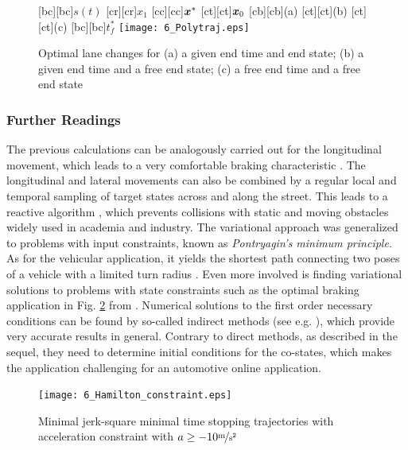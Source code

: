 \begin{figure}[h]
\centering
	[bc][bc]{$s(t)$}
	[cr][cr]{$x_1$}
	[cc][cc]{$\boldsymbol{x}^\ast$}
	[ct][ct]{$\boldsymbol{x}_0$}
	[cb][cb]{\scriptsize (a)}
	[ct][ct]{\scriptsize (b)}
	[ct][ct]{\scriptsize (c)}
	[bc][bc]{$t_f^\ast$}
	\centering
  	\texttt{[image: 6\_Polytraj.eps]}
  \caption{Optimal lane changes for (a) a given end time and end state; (b) a given end time and a free end state; (c) a free end time and a free end state}
    \label{fig:polytraj}
\end{figure}

\subsubsection{Further Readings}\label{S:57.3.1.3}

The previous calculations can be analogously carried out for the longitudinal movement, which leads to a very comfortable braking characteristic \cite{gutjahr2014automatic}. 
The longitudinal and lateral movements can also be combined by a regular local and temporal sampling of target states across and along the street. 
This leads to a reactive algorithm  \cite{wericra2010}, which prevents collisions with static and moving obstacles widely used in academia and industry.
The variational approach was generalized to problems with input constraints, known as \textit{Pontryagin's minimum principle}.
 As for the vehicular application, it yields the shortest path connecting two poses of a vehicle with a limited turn radius \cite{dubins1957cml,reeds1990optimal,boissonnat1994note}. %
Even more involved is finding variational solutions to problems with state constraints such as the optimal braking application in Fig. \ref{fig:poly_mit_unb} from \cite{werling2015habil}.
Numerical solutions to the first order necessary conditions can be found by so-called indirect methods (see e.g.  \cite{Graichen2012}),
which provide very accurate results in general. Contrary to direct methods, as described in the sequel, they need to determine initial conditions for the co-states, which makes the application challenging for an automotive online application.





\begin{figure}[ht]
\centering

\renewcommand{\matlabtextA}{\normalsize }
	\def\ylabelV{$x_2$ in $\unitfrac{m}{s}$}
	\def\ylabelA{$x_3$ in $\unitfrac{m}{s^2}$}
	\def\xlabelT{$t$ in $\unit{s}$}
	\def\xlabelX{$x_1$ in $\unit{m}$}
	\centering
  	\texttt{[image: 6\_Hamilton\_constraint.eps]}
  \caption{Minimal jerk-square minimal time stopping trajectories with acceleration constraint with $a\geq -10 \unitfrac{m}{s^2}$}
    \label{fig:poly_mit_unb}
\end{figure}



